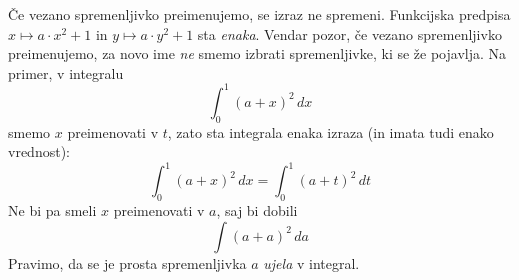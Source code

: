 Če vezano spremenljivko preimenujemo, se izraz ne spremeni. Funkcijska predpisa $x \mapsto a \cdot x^2 + 1$ in $y \mapsto a \cdot y^2 + 1$ sta \emph{enaka}. Vendar pozor, če vezano spremenljivko preimenujemo, za novo ime \emph{ne} smemo izbrati spremenljivke, ki se že pojavlja. Na primer, v integralu
%
\begin{equation*}
  \int_0^1 (a + x)^2 \, d x
\end{equation*}
%
smemo $x$ preimenovati v $t$, zato sta integrala enaka izraza (in imata tudi enako vrednost):
%
\begin{equation*}
  \int_0^1 (a + x)^2 \, d x  = \int_0^1 (a + t)^2 \, d t
\end{equation*}
%
Ne bi pa smeli $x$ preimenovati v $a$, saj bi dobili
%
\begin{equation*}
  \int (a + a)^2 \, d a
\end{equation*}
%
Pravimo, da se je prosta spremenljivka $a$ \emph{ujela} v integral.

